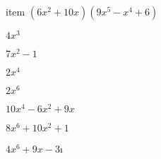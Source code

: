 \documentclass{article}
\begin{document}
\begin{multicols}{2}
item $(6x^2+10x)(9x^{5}-x^{4}+6)$\item $4x^{3}$\item $7x^2-1$\item $2x^{4}$\item $2x^{6}$\item $10x^{4}-6x^2+9x$\item $8x^{6}+10x^2+1$\item $4x^{6}+9x-3$\i
\end{multicols}
\end{document}
